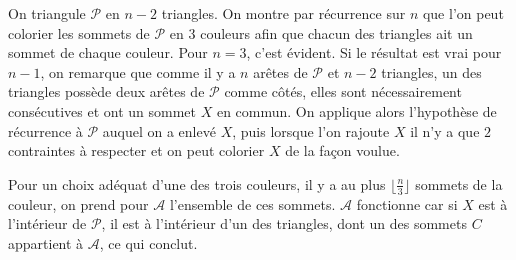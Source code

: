 \begin{sol}
On triangule $\mathcal{P}$ en $n-2$ triangles. On montre par récurrence sur $n$ que l'on peut colorier les sommets de $\mathcal{P}$ en $3$ couleurs afin que chacun des triangles ait un sommet de chaque couleur. Pour $n=3$, c'est évident. Si le résultat est vrai pour  $n-1$, on remarque que comme il y a $n$ arêtes de $\mathcal{P}$ et $n-2$ triangles, un des triangles possède deux arêtes de $\mathcal{P}$ comme côtés, elles sont nécessairement consécutives et ont un sommet $X$ en commun. On applique alors l'hypothèse de récurrence à $\mathcal{P}$ auquel on a enlevé $X$, puis lorsque l'on rajoute $X$ il n'y a que $2$ contraintes à respecter et on peut colorier $X$ de la façon voulue.

Pour un choix adéquat d'une des trois couleurs, il y a au plus $\lfloor\frac n3\rfloor$ sommets de la couleur, on prend pour $\mathcal{A}$ l'ensemble de ces sommets. $\mathcal{A}$ fonctionne car si $X$ est à l'intérieur de $\mathcal{P}$, il est à l'intérieur d'un des triangles, dont un des sommets $C$ appartient à $\mathcal{A}$, ce qui conclut.
\end{sol}

